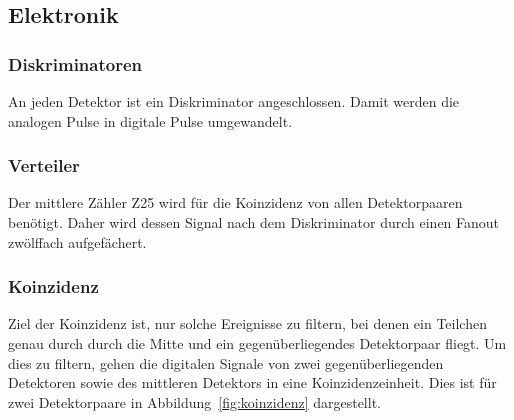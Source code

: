 \documentclass[11pt, ngerman, fleqn, DIV=15, headinclude, BCOR=2cm]{scrreprt}
\begin{document}
\subsection{Elektronik}

\subsubsection{Diskriminatoren}

An jeden Detektor ist ein Diskriminator angeschlossen. Damit werden die
analogen Pulse in digitale Pulse umgewandelt.

\subsubsection{Verteiler}

Der mittlere Zähler Z25 wird für die Koinzidenz von allen Detektorpaaren
benötigt. Daher wird dessen Signal nach dem Diskriminator durch einen Fanout
zwölffach aufgefächert.

\subsubsection{Koinzidenz}

Ziel der Koinzidenz ist, nur solche Ereignisse zu filtern, bei denen ein
Teilchen genau durch durch die Mitte und ein gegenüberliegendes Detektorpaar
fliegt. Um dies zu filtern, gehen die digitalen Signale von zwei
gegenüberliegenden Detektoren sowie des mittleren Detektors in eine
Koinzidenzeinheit. Dies ist für zwei Detektorpaare in
Abbildung~\ref{fig:koinzidenz} dargestellt.
\end{document}
